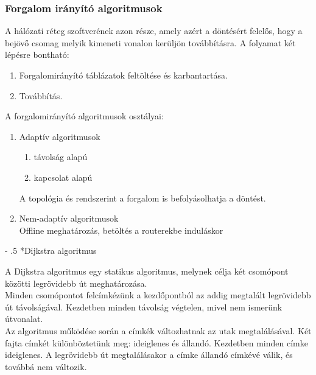 \documentclass[12pt]{article}
\makeatletter
\renewcommand\paragraph{%
	\@startsection{paragraph}{4}{0mm}%
	{-\baselineskip}%
	{.5\baselineskip}%
	{\normalfont\normalsize\bfseries}}
\makeatother
\begin{document}
	\subsubsection*{Forgalom irányító algoritmusok}

     A hálózati réteg szoftverének azon része, amely azért a döntésért felelős, hogy a bejövő csomag melyik kimeneti vonalon kerüljön továbbításra. A folyamat két lépésre bontható:
     \begin{enumerate}
        \item Forgalomirányító táblázatok feltöltése és karbantartása.
        \item Továbbítás.
     \end{enumerate}

     A forgalomirányító algoritmusok osztályai:
     \begin{enumerate}
        \item Adaptív algoritmusok
        \begin{enumerate}
            \item távolság alapú
            \item kapcsolat alapú
        \end{enumerate}
        A topológia és rendszerint a forgalom is befolyásolhatja a döntést.
        \item Nem-adaptív algoritmusok \\
        Offline meghatározás, betöltés a routerekbe induláskor
     \end{enumerate}

    \paragraph*{Dijkstra algoritmus\\}

    A Dijkstra algoritmus egy statikus algoritmus, melynek célja két csomópont közötti legrövidebb út meghatározása.\\

    \noindent Minden csomópontot felcímkézünk a kezdőpontból az addig megtalált legrövidebb út távolságával. Kezdetben minden távolság végtelen, mivel nem ismerünk útvonalat.\\

    \noindent Az algoritmus működése során a címkék változhatnak az utak megtalálásával. Két fajta címkét különböztetünk meg: ideiglenes és állandó. Kezdetben minden címke ideiglenes. A legrövidebb út megtalálásakor a címke állandó címkévé válik, és továbbá nem változik.
\end{document}
